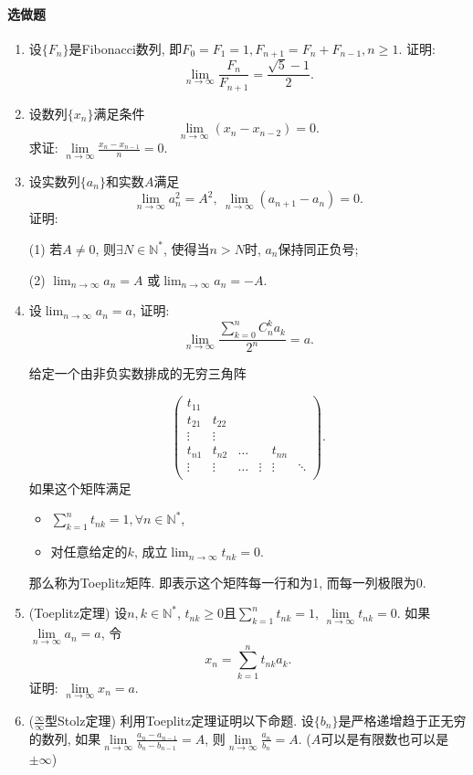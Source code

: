 \documentclass[UTF8,11pt, a4paper, oneside, fontset=none]{ctexbook}
\begin{document}
\paragraph{选做题}
\begin{enumerate}

\item 设$\{ F_n\}$是Fibonacci数列, 即$F_0 = F_1 =1, F_{n+1} = F_n + F_{n-1}, n \geq 1$. 证明: 
\[
\lim_{n \to \infty} \frac{F_n}{F_{n+1}} = \frac{\sqrt 5 -1}{2}.
\]


\item 设数列$\{x_n\}$满足条件
\[
\lim_{n \to \infty} (x_n - x_{n-2})=0.
\]
求证: $\lim\limits_{n \to \infty} \frac{x_n - x_{n-1}}{n}=0$. 

\item 设实数列$\{a_n\}$和实数$A$满足
\[
\lim_{n \to \infty} a_n^2 = A^2, \ \lim_{n \to \infty}(a_{n+1} - a_n) =0.
\]
证明: 

(1) 若$A \neq 0$, 则$\exists N \in \mathbb N^*$, 使得当$n >N$时, $a_n$保持同正负号;

(2) $\lim_{n \to \infty} a_n = A$ 或$\lim_{n \to \infty} a_n = -A$.

\item 设$\lim_{n \to \infty} a_n =a$, 证明:
\[
\lim_{n \to \infty} \frac{\sum_{k=0}^n C_n^k a_k}{2^n} =a.
\]


给定一个由非负实数排成的无穷三角阵


\[
\left( \begin{array}{ccccccc}
t_{11}      &  & & & &    \\
t_{21}      &t_{22} &  &  &   \\
\vdots      & \vdots     & &  &  &   \\
t_{n1}     & t_{n2}      & \hdots        &    & t_{nn} &    \\
\vdots & \vdots & \hdots       & \vdots       & \vdots   & \ddots  \\
\end{array} \right). 
\]
如果这个矩阵满足
\begin{itemize}
\item[(1)] $\sum_{k=1}^n t_{nk} =1, \forall n \in \mathbb N^*$,
\item[(2)] 对任意给定的$k$, 成立$\lim_{n \to \infty} t_{nk} =0$.
\end{itemize}
那么称为Toeplitz矩阵. 即表示这个矩阵每一行和为1, 而每一列极限为0.



\item (Toeplitz定理) 设$n, k \in \mathbb N^*$, $t_{nk} \geq 0$且$\sum_{k=1}^n t_{nk} =1$, $\lim\limits_{n \to \infty} t_{nk} =0$. 如果$\lim\limits_{n \to \infty} a_n =a$, 令
\[
x_n = \sum_{k=1}^n t_{nk} a_k.
\]
证明: $\lim\limits_{n \to \infty} x_n =a$.


\item ($\frac{\infty}{\infty}$型Stolz定理) 
利用Toeplitz定理证明以下命题. 设$\{b_n\}$是严格递增趋于正无穷的数列, 如果$\lim\limits_{n \to \infty} \frac{a_n - a_{n-1}}{b_n - b_{n-1}} =A$,
则$\lim\limits_{n \to \infty}\frac{a_n}{b_n} = A$. ($A$可以是有限数也可以是$\pm\infty$)



\end{enumerate}
\end{document}
